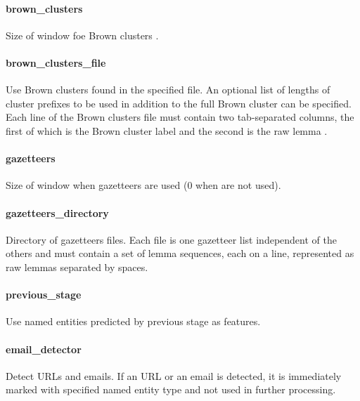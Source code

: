 \paragraph{brown\_clusters}
Size of window foe Brown clusters .

\paragraph{brown\_clusters\_file}
Use Brown clusters found in the specified file. An optional list of lengths of
cluster prefixes to be used in addition to the full Brown cluster can be specified.
Each line of the Brown clusters file must contain two tab-separated columns,
the first of which is the Brown cluster label and the second is the raw lemma .

\paragraph{gazetteers}
Size of window when gazetteers are used (0 when are not used).

\paragraph{gazetteers\_directory}
Directory of gazetteers files. Each file is one gazetteer list independent
of the others and must contain a set of lemma sequences, each on a line,
represented as raw lemmas separated by spaces.

\paragraph{previous\_stage}
Use named entities predicted by previous stage as features.

\paragraph{email\_detector}
Detect URLs and emails. If an URL or an email is detected, it is immediately marked
with specified named entity type and not used in further processing.

